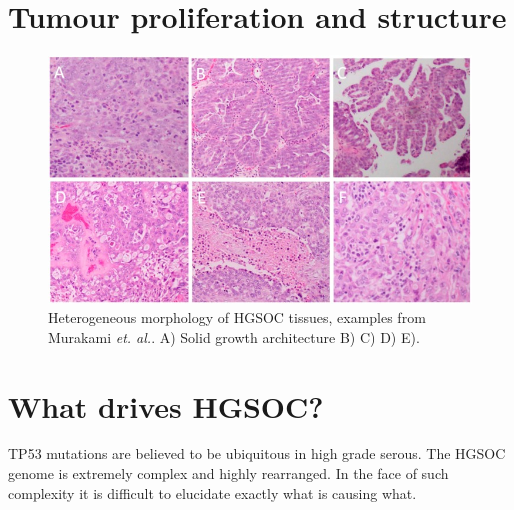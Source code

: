 \section{Tumour proliferation and structure}
\begin{figure}
    \centering
    \includegraphics[width=\textwidth]{Introduction/Figs/Raster/ijms-20-00952-g001.jpg}
    \caption[Morphology types in HGSOC]{Heterogeneous morphology of HGSOC tissues, examples from Murakami \textit{et. al.}\citep{murakami2016establishment}. A) Solid growth architecture B) C) D) E). }
    \label{fig:morphology_murakami}
\end{figure}
\citep{murakami2016establishment, Lisio2019Feb}


\section{What drives HGSOC?} %

TP53 mutations are believed to be ubiquitous in high grade serous. The HGSOC genome is extremely complex and highly rearranged. In the face of such complexity it is difficult to elucidate exactly what is causing what.  \citep{RN17}



